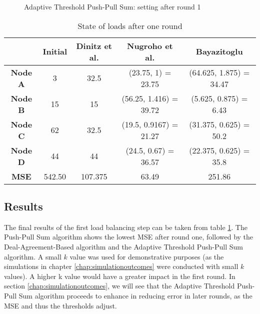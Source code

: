 \begin{figure}
    \centering
    \scalebox{0.75}{}
    \caption{Adaptive Threshold Push-Pull Sum: setting after round 1}
    \label{fig:ATPPSExampleResult}
\end{figure}

\begin{table}
    \centering
    \begin{tabular}{|c|c|c|c|c|}
    \hline
     & \textbf{Initial} & \textbf{Dinitz et al.} & \textbf{Nugroho et al.} & \textbf{Bayazitoglu} \\ \hline
    \textbf{Node A}  & 3      & 32.5    & (23.75, 1) = 23.75     & (64.625, 1.875) = 34.47 \\ \hline
    \textbf{Node B}  & 15     & 15      & (56.25, 1.416) = 39.72 & (5.625, 0.875) = 6.43   \\ \hline
    \textbf{Node C}  & 62     & 32.5    & (19.5, 0.9167) = 21.27 & (31.375, 0.625) = 50.2  \\ \hline
    \textbf{Node D}  & 44     & 44      & (24.5, 0.67) = 36.57   & (22.375, 0.625) = 35.8  \\ \hline
    \textbf{MSE} & 542.50 & 107.375 & 63.49                  & 251.86                  \\ \hline
    \end{tabular}
    \caption{State of loads after one round}
    \label{tab:overviewExamples}
\end{table}

\subsection{Results}\label{subsec:aspiredOutcomeAdaptiveThresholdPPS}
The final results of the first load balancing step can be taken from table \ref{tab:overviewExamples}. The Push-Pull Sum algorithm shows the lowest MSE after round one, followed by the Deal-Agreement-Based algorithm and the Adaptive Threshold Push-Pull Sum algorithm. A small $k$ value was used for demonstrative purposes (as the simulations in chapter \ref{chap:simulationoutcomes} were conducted with small $k$ values). A higher k value would have a greater impact in the first round. In section \ref{chap:simulationoutcomes}, we will see that the Adaptive Threshold Push-Pull Sum algorithm proceeds to enhance in reducing error in later rounds, as the MSE and thus the thresholds adjust.